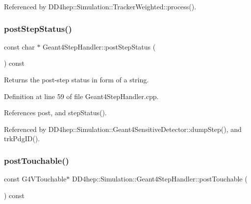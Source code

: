 Referenced by D\+D4hep\+::\+Simulation\+::\+Tracker\+Weighted\+::process().

\hypertarget{class_d_d4hep_1_1_simulation_1_1_geant4_step_handler_a2e267e523aefa237ace0474ab22a7b87}{}\label{class_d_d4hep_1_1_simulation_1_1_geant4_step_handler_a2e267e523aefa237ace0474ab22a7b87} 
\subsubsection{\texorpdfstring{post\+Step\+Status()}{postStepStatus()}}
{\footnotesize\ttfamily const char $\ast$ Geant4\+Step\+Handler\+::post\+Step\+Status (\begin{DoxyParamCaption}{ }\end{DoxyParamCaption}) const}



Returns the post-\/step status in form of a string. 



Definition at line 59 of file Geant4\+Step\+Handler.\+cpp.



References post, and step\+Status().



Referenced by D\+D4hep\+::\+Simulation\+::\+Geant4\+Sensitive\+Detector\+::dump\+Step(), and trk\+Pdg\+I\+D().

\hypertarget{class_d_d4hep_1_1_simulation_1_1_geant4_step_handler_a40e0ed6100cd44d95d7ac4f07f938a6d}{}\label{class_d_d4hep_1_1_simulation_1_1_geant4_step_handler_a40e0ed6100cd44d95d7ac4f07f938a6d} 
\subsubsection{\texorpdfstring{post\+Touchable()}{postTouchable()}}
{\footnotesize\ttfamily const G4\+V\+Touchable$\ast$ D\+D4hep\+::\+Simulation\+::\+Geant4\+Step\+Handler\+::post\+Touchable (\begin{DoxyParamCaption}{ }\end{DoxyParamCaption}) const\hspace{0.3cm}{\ttfamily [inline]}}



